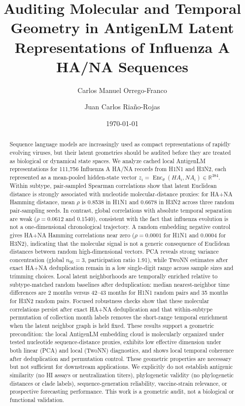 \documentclass[11pt]{article}
\title{Auditing Molecular and Temporal Geometry in AntigenLM Latent Representations of Influenza A HA/NA Sequences}
\author{
Carlos Manuel Orrego-Franco
\and
Juan Carlos Riaño-Rojas
}
\date{\today}
\newcommand{\Enc}{\operatorname{Enc}}
\newcommand{\R}{\mathbb{R}}
\begin{document}
\maketitle

\begin{abstract}
Sequence language models are increasingly used as compact representations of rapidly evolving viruses, but their latent geometries should be audited before they are treated as biological or dynamical state spaces. We analyze cached local AntigenLM representations for 111,756 Influenza A HA/NA records from H1N1 and H3N2, each represented as a mean-pooled hidden-state vector $z_i=\Enc_{\theta}(HA_i,NA_i)\in\R^{384}$. Within subtype, pair-sampled Spearman correlations show that latent Euclidean distance is strongly associated with nucleotide molecular-distance proxies: for HA+NA Hamming distance, mean $\rho$ is 0.8538 in H1N1 and 0.6678 in H3N2 across three random pair-sampling seeds. In contrast, global correlations with absolute temporal separation are weak ($\rho=0.0612$ and $0.1540$), consistent with the fact that influenza evolution is not a one-dimensional chronological trajectory. A random embedding negative control gives HA+NA Hamming correlations near zero ($\rho=0.0001$ for H1N1 and 0.0004 for H3N2), indicating that the molecular signal is not a generic consequence of Euclidean distances between random high-dimensional vectors. PCA reveals strong variance concentration (global $n_{95}=3$, participation ratio 1.91), while TwoNN estimates after exact HA+NA deduplication remain in a low single-digit range across sample sizes and trimming choices. Local latent neighborhoods are temporally enriched relative to subtype-matched random baselines after deduplication: median nearest-neighbor time differences are 2 months versus 42--43 months for H1N1 random pairs and 35 months for H3N2 random pairs. Focused robustness checks show that these molecular correlations persist after exact HA+NA deduplication and that within-subtype permutation of collection month labels removes the short-range temporal enrichment when the latent neighbor graph is held fixed. These results support a geometric precondition: the local AntigenLM embedding cloud is molecularly organized under tested nucleotide sequence-distance proxies, exhibits low effective dimension under both linear (PCA) and local (TwoNN) diagnostics, and shows local temporal coherence after deduplication and permutation control. These geometric properties are necessary but not sufficient for downstream applications. We explicitly do not establish antigenic similarity (no HI assays or neutralization titers), phylogenetic validity (no phylogenetic distances or clade labels), sequence-generation reliability, vaccine-strain relevance, or prospective forecasting performance. This work is a geometric audit, not a biological or functional validation.
\end{abstract}
\end{document}
